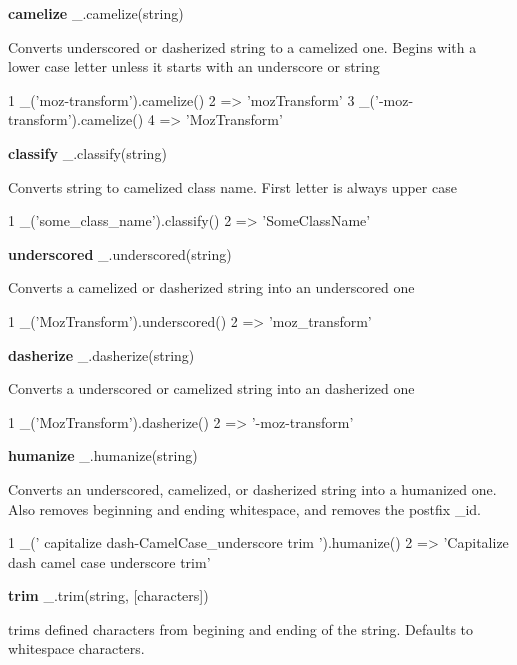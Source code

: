 {\bfseries camelize} \+\_\+.\+camelize(string)

Converts underscored or dasherized string to a camelized one. Begins with a lower case letter unless it starts with an underscore or string


\begin{DoxyCode}
1 \_('moz-transform').camelize()
2 => 'mozTransform'
3 \_('-moz-transform').camelize()
4 => 'MozTransform'
\end{DoxyCode}


{\bfseries classify} \+\_\+.\+classify(string)

Converts string to camelized class name. First letter is always upper case


\begin{DoxyCode}
1 \_('some\_class\_name').classify()
2 => 'SomeClassName'
\end{DoxyCode}


{\bfseries underscored} \+\_\+.\+underscored(string)

Converts a camelized or dasherized string into an underscored one


\begin{DoxyCode}
1 \_('MozTransform').underscored()
2 => 'moz\_transform'
\end{DoxyCode}


{\bfseries dasherize} \+\_\+.\+dasherize(string)

Converts a underscored or camelized string into an dasherized one


\begin{DoxyCode}
1 \_('MozTransform').dasherize()
2 => '-moz-transform'
\end{DoxyCode}


{\bfseries humanize} \+\_\+.\+humanize(string)

Converts an underscored, camelized, or dasherized string into a humanized one. Also removes beginning and ending whitespace, and removes the postfix \textquotesingle{}\+\_\+id\textquotesingle{}.


\begin{DoxyCode}
1 \_('  capitalize dash-CamelCase\_underscore trim  ').humanize()
2 => 'Capitalize dash camel case underscore trim'
\end{DoxyCode}


{\bfseries trim} \+\_\+.\+trim(string, \mbox{[}characters\mbox{]})

trims defined characters from begining and ending of the string. Defaults to whitespace characters.


